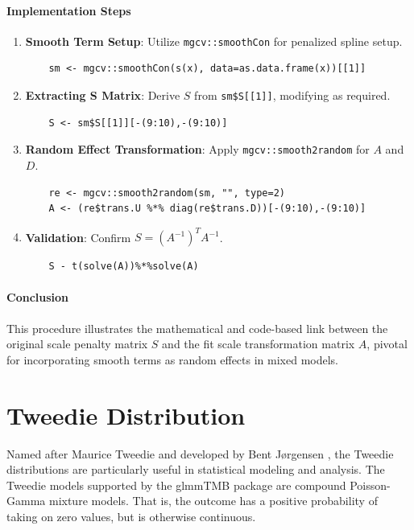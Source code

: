 \documentclass[12pt, twoside,hidelinks]{article}
\theoremstyle{definition}
\numberwithin{equation}{section}
\begin{document}
\paragraph{Implementation Steps}
\begin{enumerate}
    \item \textbf{Smooth Term Setup}: Utilize \texttt{mgcv::smoothCon} for penalized spline setup.
    \begin{verbatim}
    sm <- mgcv::smoothCon(s(x), data=as.data.frame(x))[[1]]
    \end{verbatim}
    \item \textbf{Extracting S Matrix}: Derive \( S \) from \texttt{sm\$S[[1]]}, modifying as required.
    \begin{verbatim}
    S <- sm$S[[1]][-(9:10),-(9:10)]
    \end{verbatim}
    \item \textbf{Random Effect Transformation}: Apply \texttt{mgcv::smooth2random} for \( A \) and \( D \).
    \begin{verbatim}
    re <- mgcv::smooth2random(sm, "", type=2)
    A <- (re$trans.U %*% diag(re$trans.D))[-(9:10),-(9:10)]
    \end{verbatim}
    \item \textbf{Validation}: Confirm \( S = (A^{-1})^T A^{-1} \).
    \begin{verbatim}
    S - t(solve(A))%*%solve(A)
    \end{verbatim}
\end{enumerate}

\paragraph{Conclusion}
This procedure illustrates the mathematical and code-based link between the original scale penalty matrix \( S \) and the fit scale transformation matrix \( A \), pivotal for incorporating smooth terms as random effects in mixed models.

\section{Tweedie Distribution}
\label{appendix:tweedie}

Named after Maurice Tweedie and developed by Bent Jørgensen \cite{jorgensen1987exponential}, the Tweedie distributions are particularly useful in statistical modeling and analysis.
The Tweedie models supported by the glmmTMB package are compound Poisson-Gamma mixture models. That is, the outcome has a positive probability of taking on zero values, but is otherwise continuous.
\end{document}
